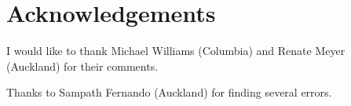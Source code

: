 \chapter{Acknowledgements}
I would like to thank Michael Williams (Columbia) and
Renate Meyer (Auckland) for their comments.

Thanks to Sampath Fernando (Auckland) for finding several errors.
